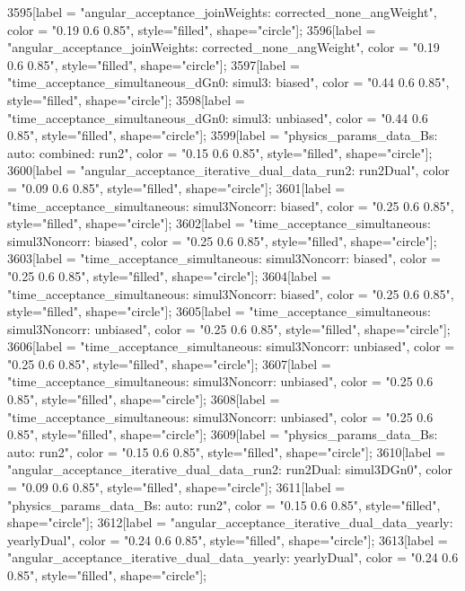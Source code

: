 {	3595[label = "angular_acceptance_joinWeights\nwflag: corrected_none_angWeight", color = "0.19 0.6 0.85", style="filled", shape="circle"];
	3596[label = "angular_acceptance_joinWeights\nwflag: corrected_none_angWeight", color = "0.19 0.6 0.85", style="filled", shape="circle"];
	3597[label = "time_acceptance_simultaneous_dGn0\ntimeacc: simul3\ntrigger: biased", color = "0.44 0.6 0.85", style="filled", shape="circle"];
	3598[label = "time_acceptance_simultaneous_dGn0\ntimeacc: simul3\ntrigger: unbiased", color = "0.44 0.6 0.85", style="filled", shape="circle"];
	3599[label = "physics_params_data_Bs\nfit: auto\ntrigger: combined\nyear: run2", color = "0.15 0.6 0.85", style="filled", shape="circle"];
	3600[label = "angular_acceptance_iterative_dual_data_run2\nangacc: run2Dual", color = "0.09 0.6 0.85", style="filled", shape="circle"];
	3601[label = "time_acceptance_simultaneous\ntimeacc: simul3Noncorr\ntrigger: biased", color = "0.25 0.6 0.85", style="filled", shape="circle"];
	3602[label = "time_acceptance_simultaneous\ntimeacc: simul3Noncorr\ntrigger: biased", color = "0.25 0.6 0.85", style="filled", shape="circle"];
	3603[label = "time_acceptance_simultaneous\ntimeacc: simul3Noncorr\ntrigger: biased", color = "0.25 0.6 0.85", style="filled", shape="circle"];
	3604[label = "time_acceptance_simultaneous\ntimeacc: simul3Noncorr\ntrigger: biased", color = "0.25 0.6 0.85", style="filled", shape="circle"];
	3605[label = "time_acceptance_simultaneous\ntimeacc: simul3Noncorr\ntrigger: unbiased", color = "0.25 0.6 0.85", style="filled", shape="circle"];
	3606[label = "time_acceptance_simultaneous\ntimeacc: simul3Noncorr\ntrigger: unbiased", color = "0.25 0.6 0.85", style="filled", shape="circle"];
	3607[label = "time_acceptance_simultaneous\ntimeacc: simul3Noncorr\ntrigger: unbiased", color = "0.25 0.6 0.85", style="filled", shape="circle"];
	3608[label = "time_acceptance_simultaneous\ntimeacc: simul3Noncorr\ntrigger: unbiased", color = "0.25 0.6 0.85", style="filled", shape="circle"];
	3609[label = "physics_params_data_Bs\nfit: auto\nyear: run2", color = "0.15 0.6 0.85", style="filled", shape="circle"];
	3610[label = "angular_acceptance_iterative_dual_data_run2\nangacc: run2Dual\ntimeacc: simul3DGn0", color = "0.09 0.6 0.85", style="filled", shape="circle"];
	3611[label = "physics_params_data_Bs\nfit: auto\nyear: run2", color = "0.15 0.6 0.85", style="filled", shape="circle"];
	3612[label = "angular_acceptance_iterative_dual_data_yearly\nangacc: yearlyDual", color = "0.24 0.6 0.85", style="filled", shape="circle"];
	3613[label = "angular_acceptance_iterative_dual_data_yearly\nangacc: yearlyDual", color = "0.24 0.6 0.85", style="filled", shape="circle"];
}
